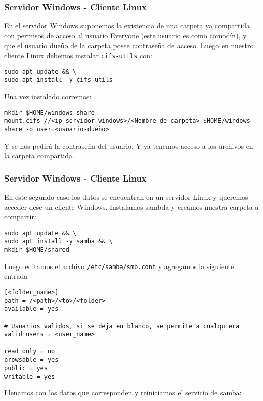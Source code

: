 \subsubsection{Servidor Windows - Cliente Linux}

En el servidor Windows suponemos la existencia de una carpeta ya compartida con permisos de acceso al usuario Everyone (este usuario es como comodín), y que el usuario dueño de la carpeta posee contraseña de acceso. Luego en nuestro cliente Linux debemos instalar \texttt{cifs-utils} con:

\begin{lstlisting}
sudo apt update && \
sudo apt install -y cifs-utils
\end{lstlisting}

Una vez instalado corremos:

\begin{lstlisting}
mkdir $HOME/windows-share
mount.cifs //<ip-servidor-windows>/<Nombre-de-carpeta> $HOME/windows-share -o user=<usuario-dueño>
\end{lstlisting}

Y se nos pedirá la contraseña del usuario. Y ya tenemos acceso a los archivos en la carpeta compartida.

\subsubsection{Servidor Windows - Cliente Linux}

En este segundo caso los datos se encuentran en un servidor Linux y queremos acceder dese un cliente Windows. Instalamos sambda y creamos nuestra carpeta a compartir:

\begin{lstlisting}
sudo apt update && \
sudo apt install -y samba && \
mkdir $HOME/shared
\end{lstlisting}

Luego editamos el archivo \texttt{/etc/samba/smb.conf} y agregamos la siguiente entrada

\begin{lstlisting}
[<folder_name>]
path = /<path>/<to>/<folder>
available = yes

# Usuarios validos, si se deja en blanco, se permite a cualquiera
valid users = <user_name>

read only = no 
browsable = yes 
public = yes 
writable = yes
\end{lstlisting}

Llenamos con los datos que corresponden y reiniciamos el servicio de samba:

